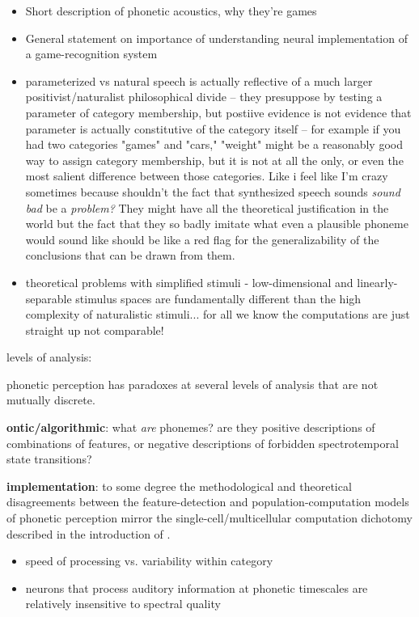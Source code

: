 \begin{itemize}
	\item Short description of phonetic acoustics, why they're games
	\item General statement on importance of understanding neural implementation of a game-recognition system
	\item parameterized vs natural speech is actually reflective of a much larger positivist/naturalist philosophical divide -- they presuppose by testing a parameter of category membership, but postiive evidence is not evidence that parameter is actually constitutive of the category itself -- for example if you had two categories "games" and "cars," "weight" might be a reasonably good way to assign category membership, but it is not at all the only, or even the most salient difference between those categories. Like i feel like I'm crazy sometimes because shouldn't the fact that synthesized speech sounds \textit{sound bad} be a \textit{problem?} They might have all the theoretical justification in the world but the fact that they so badly imitate what even a plausible phoneme would sound like should be like a red flag for the generalizability of the conclusions that can be drawn from them.
	\item theoretical problems with simplified stimuli - low-dimensional and linearly-separable stimulus spaces are fundamentally different than the high complexity of naturalistic stimuli... for all we know the computations are just straight up not comparable! \cite{schuesslerInterplayRandomnessStructure2020}

\end{itemize}


levels of analysis:

phonetic perception has paradoxes at several levels of analysis that are not mutually discrete.

\textbf{ontic/algorithmic}: what \textit{are} phonemes? are they positive descriptions of combinations of features, or negative descriptions of forbidden spectrotemporal state transitions?

\textbf{implementation}: to some degree the methodological and theoretical disagreements between the feature-detection and population-computation models of phonetic perception mirror the single-cell/multicellular computation dichotomy described in the introduction of \cite{dubreuilComplementaryRolesDimensionality2020}. 

\begin{itemize}
	\item speed of processing vs. variability within category
	\item neurons that process auditory information at phonetic timescales are relatively insensitive to spectral quality \cite{norman-haignereHierarchicalIntegrationMultiple2020}
\end{itemize}


